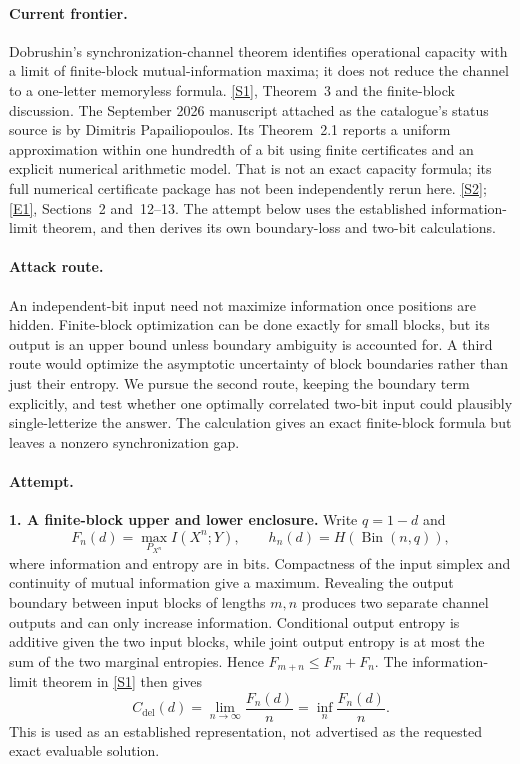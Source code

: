 \documentclass[11pt,a4paper]{article}
\newcommand{\sref}[2]{\hyperlink{source:#1:#2}{[S#2]}}
\newcommand{\eref}[2]{\hyperlink{extra:#1:#2}{[E#2]}}
\numberwithin{equation}{section}
\begin{document}
\paragraph{Current frontier.}
Dobrushin's synchronization-channel theorem identifies operational
capacity with a limit of finite-block mutual-information maxima; it
does not reduce the channel to a one-letter memoryless formula.
\sref{statement}{1}, Theorem~3 and the finite-block discussion.
The September 2026 manuscript attached as the catalogue's status source
is by Dimitris Papailiopoulos. Its Theorem~2.1 reports a uniform
approximation within one hundredth of a bit using finite certificates
and an explicit numerical arithmetic model. That is not an exact capacity
formula; its full numerical certificate package has not been independently
rerun here. \sref{statement}{2}; \eref{statement}{1}, Sections~2 and~12--13.
The attempt below uses the established information-limit theorem, and
then derives its own boundary-loss and two-bit calculations.

\paragraph{Attack route.}
An independent-bit input need not maximize information once positions
are hidden. Finite-block optimization can be done exactly for small
blocks, but its output is an upper bound unless boundary ambiguity is
accounted for. A third route would optimize the asymptotic uncertainty
of block boundaries rather than just their entropy. We pursue the
second route, keeping the boundary term explicitly, and test whether
one optimally correlated two-bit input could plausibly single-letterize
the answer. The calculation gives an exact finite-block formula but
leaves a nonzero synchronization gap.

\paragraph{Attempt.}
\textbf{1. A finite-block upper and lower enclosure.}
Write $q=1-d$ and
\[
 F_n(d)=\max_{P_{X^n}}I(X^n;Y),\qquad
 h_n(d)=H(\operatorname{Bin}(n,q)),
\]
where information and entropy are in bits. Compactness of the input
simplex and continuity of mutual information give a maximum. Revealing
the output boundary between input blocks of lengths $m,n$ produces two
separate channel outputs and can only increase information. Conditional
output entropy is additive given the two input blocks, while joint
output entropy is at most the sum of the two marginal entropies. Hence
$F_{m+n}\le F_m+F_n$. The information-limit theorem in \sref{statement}{1}
then gives
\[
 C_{\mathrm{del}}(d)=\lim_{n\to\infty}\frac{F_n(d)}n
                  =\inf_n\frac{F_n(d)}n.
\]
This is used as an established representation, not advertised as the
requested exact evaluable solution.
\end{document}

